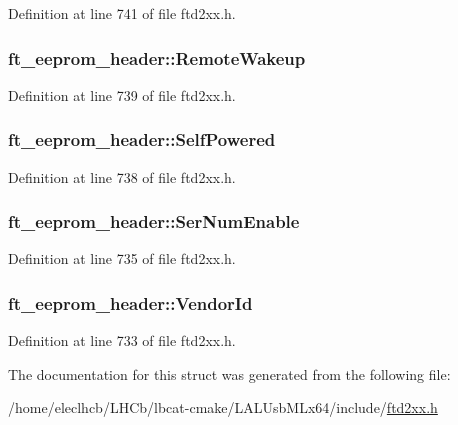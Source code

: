 Definition at line 741 of file ftd2xx.h.\hypertarget{structft__eeprom__header_a923b8578325e21645cc18b54784966f4}{
\subsubsection[{RemoteWakeup}]{ {\bf ft\_\-eeprom\_\-header::RemoteWakeup}}}
\label{structft__eeprom__header_a923b8578325e21645cc18b54784966f4}


Definition at line 739 of file ftd2xx.h.\hypertarget{structft__eeprom__header_a98fe9504d952d4d579dd8d047a70d175}{
\subsubsection[{SelfPowered}]{ {\bf ft\_\-eeprom\_\-header::SelfPowered}}}
\label{structft__eeprom__header_a98fe9504d952d4d579dd8d047a70d175}


Definition at line 738 of file ftd2xx.h.\hypertarget{structft__eeprom__header_a04737398a9c4f758975303df5f0430e6}{
\subsubsection[{SerNumEnable}]{ {\bf ft\_\-eeprom\_\-header::SerNumEnable}}}
\label{structft__eeprom__header_a04737398a9c4f758975303df5f0430e6}


Definition at line 735 of file ftd2xx.h.\hypertarget{structft__eeprom__header_a63538171dfe221e65f0bd27938239c30}{
\subsubsection[{VendorId}]{ {\bf ft\_\-eeprom\_\-header::VendorId}}}
\label{structft__eeprom__header_a63538171dfe221e65f0bd27938239c30}


Definition at line 733 of file ftd2xx.h.

The documentation for this struct was generated from the following file:\begin{DoxyCompactItemize}
\item 
/home/eleclhcb/LHCb/lbcat-\/cmake/LALUsbMLx64/include/\hyperlink{LALUsbMLx64_2include_2ftd2xx_8h}{ftd2xx.h}\end{DoxyCompactItemize}
